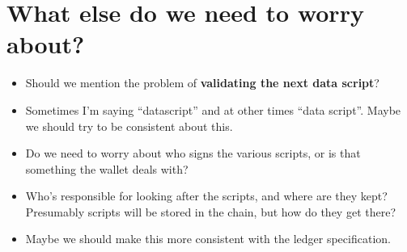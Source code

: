\documentclass[a4paper]{article}
\newcommand{\blue}[1]{\textcolor{blue}{#1}}
\theoremstyle{definition}  %
\begin{document}
\section{What else do we need to worry about?}
\begin{itemize}

\item Should we mention the problem of \textbf{validating the next data script}?

\item Sometimes I'm saying ``datascript'' and at other times ``data script''.
  Maybe we should try to be consistent about this.

\item Do we need to worry about who signs the various scripts, or is that
  something the wallet deals with?

\item Who's responsible for looking after the scripts, and where are they kept?
  Presumably scripts will be stored in the chain, but how do they get there?

\item Maybe we should make this more consistent with the ledger specification.
\end{itemize}






\end{document}
